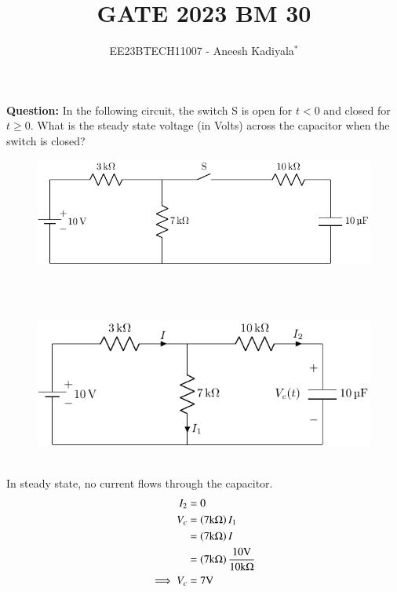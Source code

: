 \documentclass[journal,12pt,twocolumn]{IEEEtran}
\theoremstyle{remark}
\begin{document}

\vspace{3cm}

\title{GATE 2023 BM 30}
\author{EE23BTECH11007 - Aneesh Kadiyala$^{*}$%
}
\maketitle
\newpage
\bigskip

\renewcommand{\thefigure}{\theenumi}
\renewcommand{\thetable}{\theenumi}

\vspace{3cm}
\textbf{Question:} In the following circuit, the switch S is open for $t < 0$ and closed for $t \ge 0$.
What is the steady state voltage (in Volts) across the capacitor when the switch is closed?
\begin{figure}[h!]
    \centering
    \includegraphics[width = \columnwidth]{figs/c_fig1.pdf}
\end{figure}
\\
\solution
\\
\begin{figure}[h!]
    \centering
    \includegraphics[width=\columnwidth]{figs/c_fig3.pdf}
\end{figure}
\\
In steady state, no current flows through the capacitor.
\begin{align}
I_2 &= 0 \\
V_c &= \left(7\text{k}\ohm\right)I_1 \\
&= \left(7\text{k}\ohm\right)I \\
&= \left(7\text{k}\ohm\right)\frac{10\text{V}}{10\text{k}\ohm} \\
\implies V_c &= 7\text{V}
\end{align}
\end{document}
